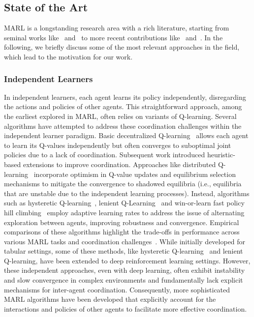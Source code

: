 \documentclass[sigconf]{acmart}
\begin{document}
\subsection{State of the Art}\label{sec:sota}
MARL is a longstanding research area with a rich literature, starting 
from seminal works like~\cite{tan1993multi} and~\cite{busoniu2008comprehensive} to more recent contributions like~\cite{gronauer2022multi} and~\cite{canese2021multi}.
%
In the following, we briefly discuss some of the most relevant approaches in the field, which lead to the motivation for our work.
\subsubsection{Independent Learners}
In independent learners, each agent learns its policy independently, disregarding the actions and policies of other agents. 
This straightforward approach, among the earliest explored in MARL, often relies on variants of Q-learning. 
%
Several algorithms have attempted to address these coordination challenges within the independent learner paradigm. 
Basic decentralized Q-learning~\cite{tan1993multi} allows each agent to learn its Q-values independently but often converges to suboptimal joint policies due to a lack of coordination. 
Subsequent work introduced heuristic-based extensions to improve coordination.
Approaches like distributed Q-learning~\cite{lauer2000algorithm} incorporate optimism in Q-value updates and equilibrium selection mechanisms to mitigate the convergence to shadowed equilibria (i.e., equilibria that are unstable due to the independent learning processes). 
Instead, algorithms such as hysteretic Q-learning~\cite{matignon2007hysteretic}, lenient Q-Learning~\cite{bloembergen2010lenient} and win-or-learn fast policy hill climbing~\cite{bowling2002multiagent} employ adaptive learning rates to address the issue of alternating exploration between agents, improving robustness and convergence.
%
Empirical comparisons of these algorithms highlight the trade-offs in performance across various MARL tasks and coordination challenges~\cite{matignon2012independent}. 
While initially developed for tabular settings, some of these methods, like hysteretic Q-learning~\cite{palmer2017lenient} and lenient Q-learning, have been extended to deep reinforcement learning settings. 
However, these independent approaches, even with deep learning, often exhibit instability and slow convergence in complex environments and fundamentally lack explicit mechanisms for inter-agent coordination. 
Consequently, more sophisticated MARL algorithms have been developed that explicitly account for the interactions and policies of other agents to facilitate more effective coordination.
\end{document}
